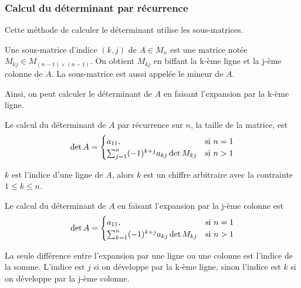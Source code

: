 \subsubsection{Calcul du déterminant par récurrence}
Cette méthode de calculer le déterminant utilise les sous-matrices.
\begin{definition}
    \label{sous_matrice}
    Une sous-matrice d'indice $(k, j)$ de $A \in M_n$ est une matrice notée $M_{kj} \in M_{(n-1) \times (n-1)}$. On obtient $M_{kj}$ en biffant la k-ème ligne et la j-ème colonne de $A$. La sous-matrice est aussi appelée le mineur de $A$.
\end{definition}
Ainsi, on peut calculer le déterminant de $A$ en faisant l'expansion par la k-ème ligne.
\begin{theorem}
    Le calcul du déterminant de $A$ par récurrence sur $n$, la taille de la matrice, est 
    \[
        \det A = \begin{cases}
            a_{11},                                   & \textup{si } n = 1 \\
            \sum_{j = 1}^{n} (-1)^{k + j}a_{kj} \det{M_{kj}} & \textup{si } n > 1
        \end{cases}
    \]
\end{theorem}
\begin{remark}
    $k$ est l'indice d'une ligne de $A$, alors $k$ est un chiffre arbitraire avec la contrainte $1 \leq k \leq n$.
\end{remark}
\begin{corollary}
    Le calcul du déterminant de $A$ en faisant l'expansion par la j-ème colonne est
    \[
        \det A = \begin{cases}
            a_{11},                                   & \textup{si } n = 1 \\
            \sum_{k = 1}^{n} (-1)^{k + j}a_{kj} \det{M_{kj}} & \textup{si } n > 1
        \end{cases}
    \]
\end{corollary}
\begin{remark}
    La seule différence entre l'expansion par une ligne ou une colonne est l'indice de la somme. L'indice est $j$ si on développe par la k-ème ligne, sinon l'indice est $k$ si on développe par la j-ème colonne.
\end{remark}

